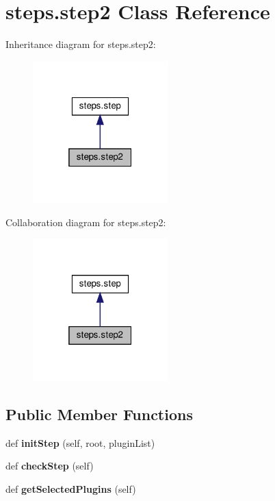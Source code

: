 \hypertarget{classsteps_1_1step2}{}\section{steps.\+step2 Class Reference}
\label{classsteps_1_1step2}


Inheritance diagram for steps.\+step2\+:
\nopagebreak
\begin{figure}[H]
\begin{center}
\leavevmode
\includegraphics[width=148pt]{classsteps_1_1step2__inherit__graph}
\end{center}
\end{figure}


Collaboration diagram for steps.\+step2\+:
\nopagebreak
\begin{figure}[H]
\begin{center}
\leavevmode
\includegraphics[width=148pt]{classsteps_1_1step2__coll__graph}
\end{center}
\end{figure}
\subsection*{Public Member Functions}
\begin{DoxyCompactItemize}
\item 
\mbox{\label{classsteps_1_1step2_a20569be40318e259f4d6f96dcfadae92}} 
def {\bfseries init\+Step} (self, root, plugin\+List)
\item 
\mbox{\label{classsteps_1_1step2_a5751caa3226cb267358a65416f93dc25}} 
def {\bfseries check\+Step} (self)
\item 
\mbox{\label{classsteps_1_1step2_ae56bb07889d046da9c7f97fa7e77a2f6}} 
def {\bfseries get\+Selected\+Plugins} (self)
\end{DoxyCompactItemize}

